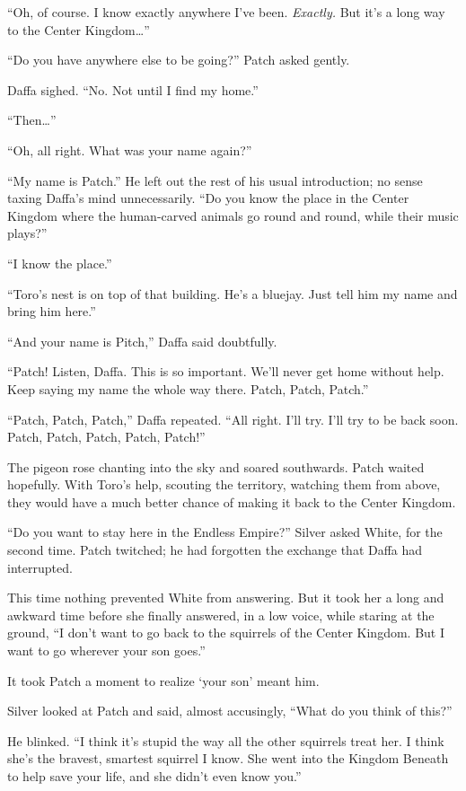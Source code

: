 \documentclass[ebook,oneside,openany,17pt]{memoir}
\begin{document}
“Oh, of course. I know exactly anywhere I’ve been. \emph{Exactly.}
But it’s a long way to the Center Kingdom…”

“Do you have anywhere else to be going?” Patch asked gently.

Daffa sighed. “No. Not until I find my home.”

“Then…”

“Oh, all right. What was your name again?”

“My name is Patch.” He left out the rest of his usual introduction; no
sense taxing Daffa’s mind unnecessarily. “Do you know the place in the
Center Kingdom where the human-carved animals go round and round,
while their music plays?”

“I know the place.”

“Toro’s nest is on top of that building. He’s a bluejay. Just tell him
my name and bring him here.”

“And your name is Pitch,” Daffa said doubtfully.

“Patch! Listen, Daffa. This is so important. We’ll never get home
without help. Keep saying my name the whole way there. Patch, Patch,
Patch.”

“Patch, Patch, Patch,” Daffa repeated. “All right. I’ll try. I’ll try
to be back soon. Patch, Patch, Patch, Patch, Patch!”

The pigeon rose chanting into the sky and soared southwards. Patch
waited hopefully. With Toro’s help, scouting the territory, watching
them from above, they would have a much better chance of making it
back to the Center Kingdom.

“Do you want to stay here in the Endless Empire?” Silver asked White,
for the second time. Patch twitched; he had forgotten the exchange
that Daffa had interrupted.

This time nothing prevented White from answering. But it took her a
long and awkward time before she finally answered, in a low voice,
while staring at the ground, “I don’t want to go back to the squirrels
of the Center Kingdom. But I want to go wherever your son goes.”

It took Patch a moment to realize ‘your son’ meant him.

Silver looked at Patch and said, almost accusingly, “What do you think
of this?”

He blinked. “I think it’s stupid the way all the other squirrels treat
her. I think she’s the bravest, smartest squirrel I know. She went
into the Kingdom Beneath to help save your life, and she didn’t even
know you.”
\end{document}
